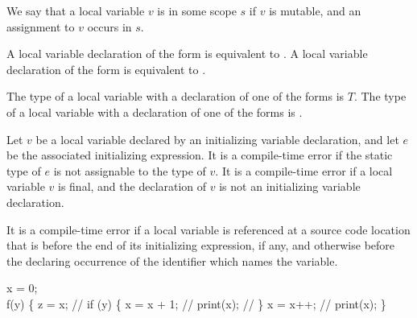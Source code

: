 \documentclass[makeidx]{article}
\begin{document}
{\LMHash{}%
We say that a local variable $v$ is 
in some scope $s$
if $v$ is mutable, and an assignment to $v$ occurs in $s$.

\LMHash{}%
A local variable declaration of the form  is equivalent to .
A local variable declaration of the form  is equivalent to .


\LMHash{}%
The type of a local variable with a declaration of one of the forms
is $T$.
The type of a local variable with a declaration of one of the forms
is \DYNAMIC{}.

\LMHash{}%
Let $v$ be a local variable declared by an initializing variable declaration,
and let $e$ be the associated initializing expression.
It is a compile-time error if the static type of $e$ is not assignable to the type of $v$.
It is a compile-time error if a local variable $v$ is final,
and the declaration of $v$ is not an initializing variable declaration.


\LMHash{}%
It is a compile-time error if
a local variable is referenced at a source code location that is before
the end of its initializing expression, if any,
and otherwise before the declaring occurrence of
the identifier which names the variable.


\begin{dartCode}
\VAR{} x = 0;
\\
f(y) \{
  \VAR{} z = x; // 
  if (y) \{
    x = x + 1; // 
    print(x); // 
  \}
  \VAR{} x = x++; // 
  print(x);
\}
\end{dartCode}

}
\end{document}
